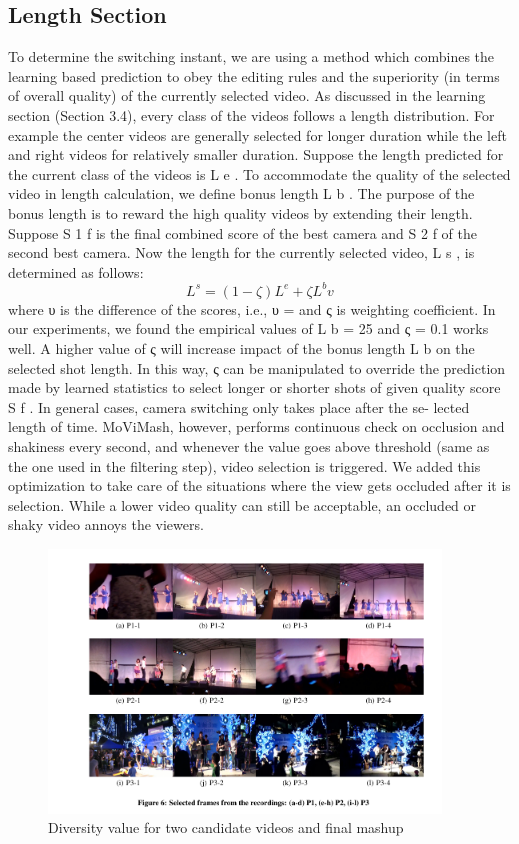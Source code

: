 \documentclass{sig-alternate}
\begin{document}
\subsection{Length Section}
To determine the switching instant, we are using a method which
combines the learning based prediction to obey the editing rules and
the superiority (in terms of overall quality) of the currently selected
video. As discussed in the learning section (Section 3.4), every
class of the videos follows a length distribution. For example the
center videos are generally selected for longer duration while the
left and right videos for relatively smaller duration.
Suppose the length predicted for the current class of the videos
is L e . To accommodate the quality of the selected video in length
calculation, we define bonus length L b . The purpose of the bonus
length is to reward the high quality videos by extending their length.
Suppose S 1 f is the final combined score of the best camera and S 2 f
of the second best camera. Now the length for the currently selected
video, L s , is determined as follows:
\begin{equation}
L^s = (1- \zeta)L^e + \zeta L^bv
\end{equation}
where υ is the difference of the scores, i.e., υ =
and ς is
weighting coefficient. In our experiments, we found the empirical
values of L b = 25 and ς = 0.1 works well. A higher value of
ς will increase impact of the bonus length L b on the selected shot
length. In this way, ς can be manipulated to override the prediction
made by learned statistics to select longer or shorter shots of given
quality score S f .
In general cases, camera switching only takes place after the se-
lected length of time. MoViMash, however, performs continuous
check on occlusion and shakiness every second, and whenever the
value goes above threshold (same as the one used in the filtering
step), video selection is triggered. We added this optimization to
take care of the situations where the view gets occluded after it is
selection. While a lower video quality can still be acceptable, an
occluded or shaky video annoys the viewers.

 \begin{figure}[h]
\includegraphics[width=\textwidth ,height = 7cm]{8}
\caption{Diversity value for two candidate videos and ﬁnal mashup}
\label{fig:figure5}
\end{figure}
\end{document}
